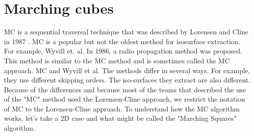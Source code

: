 \chapter{Marching cubes}
MC is a sequential traversal technique that was described by Lorensen and Cline in 1987 \cite{LorensenCline}. MC is a popular but not the oldest method for isosurface extraction. For example, Wyvill et. al. \cite{WyvillEtAl} In 1986, a radio propagation method was proposed. This method is similar to the MC method and is sometimes called the MC approach. MC and Wyvill et al. The methods differ in several ways. For example, they use different skipping orders. The iso-surfaces they extract are also different. Because of the differences and because most of the teams that described the use of the "MC" method used the Lorensen-Cline approach, we restrict the notation of MC to the Lorensen-Cline approach.
To understand how the MC algorithm works, let's take a 2D case and what might be called the "Marching Squares" algorithm.\\
